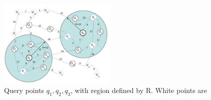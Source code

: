 \begin{figure}[hbt]
  \center
        \includegraphics[width=0.5\textwidth]{figures/queryreg}
        \caption{Query points $q_1,q_2,q_3$, with region defined by R. White points are \poins}
  \label{fig:queryreg}
\end{figure}
